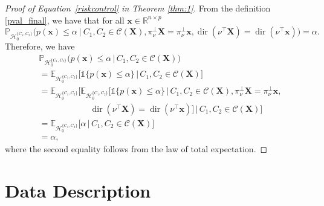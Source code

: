 \documentclass[a4paper,11pt]{article}
\theoremstyle{plain}
\newcommand{\1}{\mathbf{1}}
\newcommand{\projnu}{\pi_{\nu}^{\perp}}
\begin{document}
\begin{proof}[Proof of Equation~\ref{riskcontrol} in Theorem \ref{thm:1}]
  From the definition \eqref{pval_final}, we have that for all $\mathbf{x} \in \mathbb{R}^{n \times p}$ 
  \begin{equation}
    \mathbb{P}_{\mathcal{H}_0^{\{C_1,C_2\}}}\bigl(p(\mathbf{x}) \leq \alpha ~|~ C_1,C_2 \in \mathcal{C}(\mathbf{X}), \projnu \mathbf{X} = \projnu \mathbf{x}, \operatorname{dir}(\nu^\top \mathbf{X}) = \operatorname{dir}(\nu^\top \mathbf{x})\bigr) = \alpha.
  \end{equation}
  Therefore, we have
\begin{equation}
\begin{aligned}
& \mathbb{P}_{\mathcal{H}_0^{\{C_1,C_2\}}}\big(p(\mathbf{x}) \le \alpha 
    \,\big|\, C_1,C_2 \in \mathcal{C}(\mathbf{X})\big) \\
&= \mathbb{E}_{\mathcal{H}_0^{\{C_1,C_2\}}}
    \Big[
        \mathds{1}\{p(\mathbf{x}) \le \alpha\} 
        \,\big|\, C_1,C_2 \in \mathcal{C}(\mathbf{X})
    \Big] \\
&= \mathbb{E}_{\mathcal{H}_0^{\{C_1,C_2\}}}
    \Big[
        \mathbb{E}_{\mathcal{H}_0^{\{C_1,C_2\}}}
        \Big[
            \mathds{1}\{p(\mathbf{x}) \le \alpha\} \,\Big|\,
            C_1,C_2 \in \mathcal{C}(\mathbf{X}),
            \projnu \mathbf{X} = \projnu \mathbf{x}, \\
&\qquad\qquad\qquad
            \operatorname{dir}(\nu^\top \mathbf{X}) = \operatorname{dir}(\nu^\top \mathbf{x})
        \Big] 
        \,\Big|\, C_1,C_2 \in \mathcal{C}(\mathbf{X})
    \Big] \\
&= \mathbb{E}_{\mathcal{H}_0^{\{C_1,C_2\}}}
    \big[\alpha \,\big|\, C_1,C_2 \in \mathcal{C}(\mathbf{X})\big] \\
&= \alpha,
\end{aligned}
\end{equation}
  where the second equality follows from the law of total expectation.
\end{proof}


\section{Data Description}\label{app:data}
\end{document}
